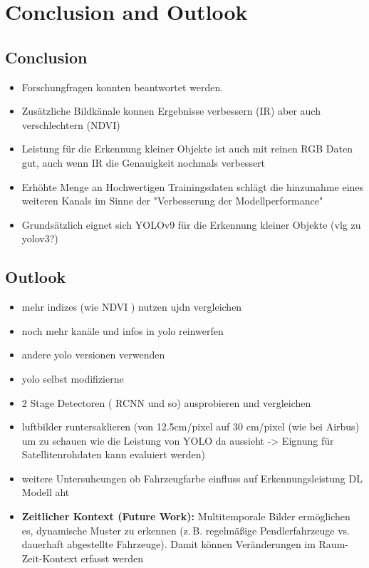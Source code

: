 \chapter{Conclusion and Outlook}
\label{ch:conclusion}

\section{Conclusion}
\begin{itemize}
    \item Forschungfragen konnten beantwortet werden. 
    \item Zusätzliche Bildkänale konnen Ergebnisse verbessern (IR) aber auch verschlechtern (NDVI)
    \item Leistung für die Erkennung kleiner Objekte ist auch mit reinen RGB Daten gut, auch wenn IR die Genauigkeit nochmals verbessert
    \item Erhöhte Menge an Hochwertigen Trainingsdaten schlägt die hinzunahme eines weiteren Kanals im Sinne der "Verbesserung der Modellperformance"
    \item Grundsätzlich eignet sich YOLOv9 für die Erkennung kleiner Objekte (vlg zu yolov3?)
\end{itemize}
\section{Outlook}
\begin{itemize}
    \item mehr indizes (wie NDVI ) nutzen ujdn vergleichen
    \item noch mehr kanäle und infos in yolo reinwerfen
    \item andere yolo versionen verwenden
    \item yolo selbst modifizierne
    \item 2 Stage Detectoren ( RCNN und so) ausprobieren und vergleichen
    \item luftbilder runtersaklieren (von 12.5cm/pixel auf 30 cm/pixel (wie bei Airbus) um zu schauen wie die Leistung von YOLO da aussieht -> Eignung für Satellitenrohdaten kann evaluiert werden)
    \item weitere Untersuhcungen ob Fahrzeugfarbe einfluss auf Erkennungsleistung DL Modell aht
    \item  \textbf{Zeitlicher Kontext (Future Work):} 
    Multitemporale Bilder ermöglichen es, dynamische Muster zu erkennen 
    (z.\,B. regelmäßige Pendlerfahrzeuge vs. dauerhaft abgestellte Fahrzeuge). 
    Damit können Veränderungen im Raum-Zeit-Kontext erfasst werden
\end{itemize}

